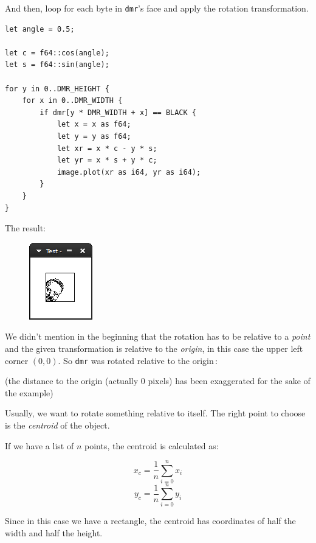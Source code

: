 \documentclass[12pt,openany,a4,usenames,dvipsnames]{book}
\newcommand\pixels{{\pixelfont{}pixels}}
\begin{document}
And then, loop for each byte in \texttt{dmr}'s face and apply the rotation transformation.

\begin{verbatim}
let angle = 0.5;

let c = f64::cos(angle);
let s = f64::sin(angle);

for y in 0..DMR_HEIGHT {
    for x in 0..DMR_WIDTH {
        if dmr[y * DMR_WIDTH + x] == BLACK {
            let x = x as f64;
            let y = y as f64;
            let xr = x * c - y * s;
            let yr = x * s + y * c;
            image.plot(xr as i64, yr as i64);
        }
    }
}
\end{verbatim}

The result:

\begin{figure}[H]
\centering
\includegraphics{figures/ch11-2.png}
\end{figure}

We didn't mention in the beginning that the rotation has to be relative to a \emph{point} and the given transformation is relative to the \emph{origin}, in this case the upper left corner $(0,0)$. So \texttt{dmr} was rotated relative to the origin\,:
\begin{figure}[H]
\centering
  \def\svgscale{0.6}

  \def\svgscale{0.6}

\end{figure}

{\centering{}
\noindent(the distance to the origin (actually 0 \pixels{}) has been exaggerated for the sake of the example)
}

Usually, we want to rotate something relative to itself. The right point to choose is the \emph{centroid} of the object.

If we have a list of $n$ points, the centroid is calculated as:

$$ x_c = \frac{1}{n}\sum_{i=0}^{n} x_i $$
$$ y_c = \frac{1}{n}\sum_{i=0}^{n} y_i $$

Since in this case we have a rectangle, the centroid has coordinates of half the width and half the height.
\end{document}
